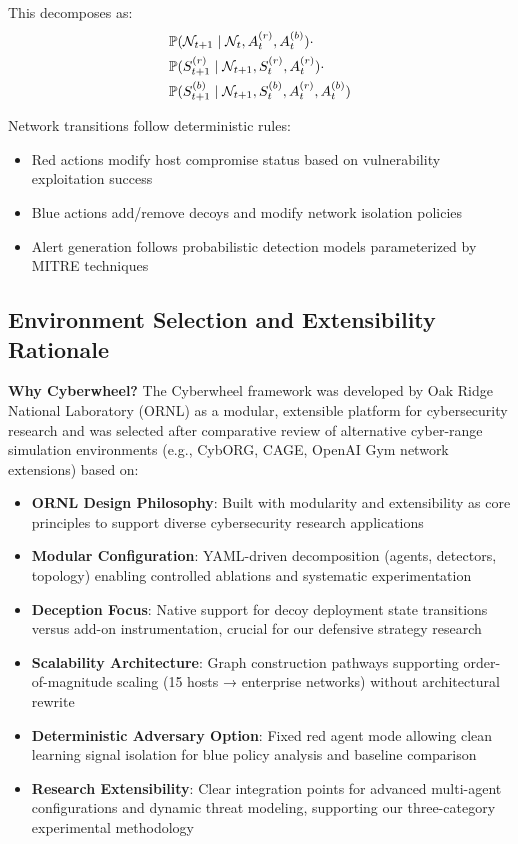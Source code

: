 \documentclass[12pt]{article}
\theoremstyle{definition}
\theoremstyle{plain}
\begin{document}
This decomposes as:
\begin{align}
&\mathbb{P}(\mathcal{N}_{t+1} \mid \mathcal{N}_t, A_t^{(r)}, A_t^{(b)}) \cdot \\
&\mathbb{P}(S_{t+1}^{(r)} \mid \mathcal{N}_{t+1}, S_t^{(r)}, A_t^{(r)}) \cdot \\
&\mathbb{P}(S_{t+1}^{(b)} \mid \mathcal{N}_{t+1}, S_t^{(b)}, A_t^{(r)}, A_t^{(b)})
\end{align}

Network transitions follow deterministic rules:
\begin{itemize}
    \item Red actions modify host compromise status based on vulnerability exploitation success
    \item Blue actions add/remove decoys and modify network isolation policies
    \item Alert generation follows probabilistic detection models parameterized by MITRE techniques
\end{itemize}

\subsection{Environment Selection and Extensibility Rationale}

\textbf{Why Cyberwheel?} The Cyberwheel framework was developed by Oak Ridge National Laboratory (ORNL) as a modular, extensible platform for cybersecurity research and was selected after comparative review of alternative cyber-range simulation environments (e.g., CybORG, CAGE, OpenAI Gym network extensions) based on:
\begin{itemize}
    \item \textbf{ORNL Design Philosophy}: Built with modularity and extensibility as core principles to support diverse cybersecurity research applications
    \item \textbf{Modular Configuration}: YAML-driven decomposition (agents, detectors, topology) enabling controlled ablations and systematic experimentation
    \item \textbf{Deception Focus}: Native support for decoy deployment state transitions versus add-on instrumentation, crucial for our defensive strategy research
    \item \textbf{Scalability Architecture}: Graph construction pathways supporting order-of-magnitude scaling (15 hosts → enterprise networks) without architectural rewrite
    \item \textbf{Deterministic Adversary Option}: Fixed red agent mode allowing clean learning signal isolation for blue policy analysis and baseline comparison
    \item \textbf{Research Extensibility}: Clear integration points for advanced multi-agent configurations and dynamic threat modeling, supporting our three-category experimental methodology
\end{itemize}
\end{document}
